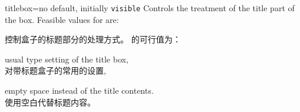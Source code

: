 \begin{docTcbKey}[][doc new=2019-03-01]{titlebox}{=}{no default, initially \texttt{visible}}
Controls the treatment of the title part of the box.
Feasible values for  are:

控制盒子的标题部分的处理方式。  的可行值为：

\begin{DescriptionR}{}
\item[\docValue{visible}]usual type setting of the title box,\\
对带标题盒子的常用的设置,
\item[\docValue{invisible}]empty space instead of the title contents.\\
使用空白代替标题内容。
\end{DescriptionR}





\end{docTcbKey}
